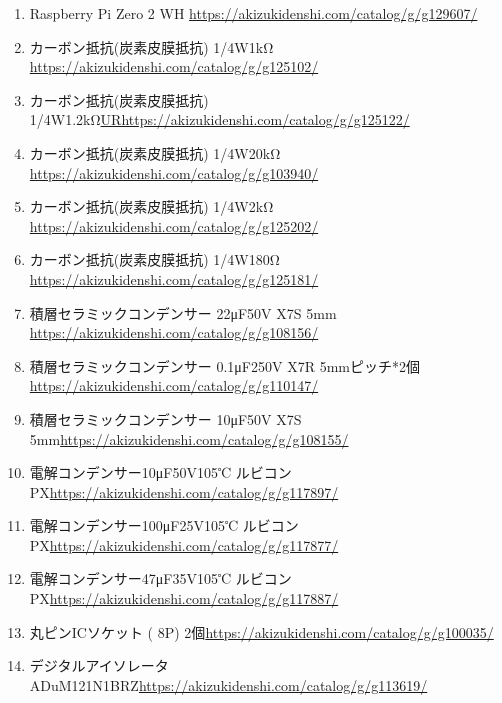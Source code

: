 \documentclass[a4paper,10pt]{jarticle}
\begin{document}
\begin{enumerate}
    \item Raspberry Pi Zero 2 WH \url{https://akizukidenshi.com/catalog/g/g129607/}
    \item カーボン抵抗(炭素皮膜抵抗) 1/4W1kΩ \url{https://akizukidenshi.com/catalog/g/g125102/}
    \item カーボン抵抗(炭素皮膜抵抗) 1/4W1.2kΩ\url{URhttps://akizukidenshi.com/catalog/g/g125122/}
    \item カーボン抵抗(炭素皮膜抵抗) 1/4W20kΩ \url{https://akizukidenshi.com/catalog/g/g103940/}
    \item カーボン抵抗(炭素皮膜抵抗) 1/4W2kΩ \url{https://akizukidenshi.com/catalog/g/g125202/}
    \item カーボン抵抗(炭素皮膜抵抗) 1/4W180Ω \url{https://akizukidenshi.com/catalog/g/g125181/}
    \item 積層セラミックコンデンサー 22μF50V X7S 5mm \url{https://akizukidenshi.com/catalog/g/g108156/}
    \item 積層セラミックコンデンサー 0.1μF250V X7R 5mmピッチ*2個\url{https://akizukidenshi.com/catalog/g/g110147/}
    \item 積層セラミックコンデンサー 10μF50V X7S 5mm\url{https://akizukidenshi.com/catalog/g/g108155/}
    \item 電解コンデンサー10μF50V105℃ ルビコンPX\url{https://akizukidenshi.com/catalog/g/g117897/}
    \item 電解コンデンサー100μF25V105℃ ルビコンPX\url{https://akizukidenshi.com/catalog/g/g117877/}
    \item 電解コンデンサー47μF35V105℃ ルビコンPX\url{https://akizukidenshi.com/catalog/g/g117887/}
    \item 丸ピンICソケット ( 8P) 2個\url{https://akizukidenshi.com/catalog/g/g100035/}
    \item デジタルアイソレータADuM121N1BRZ\url{https://akizukidenshi.com/catalog/g/g113619/}

\end{enumerate}
\end{document}
